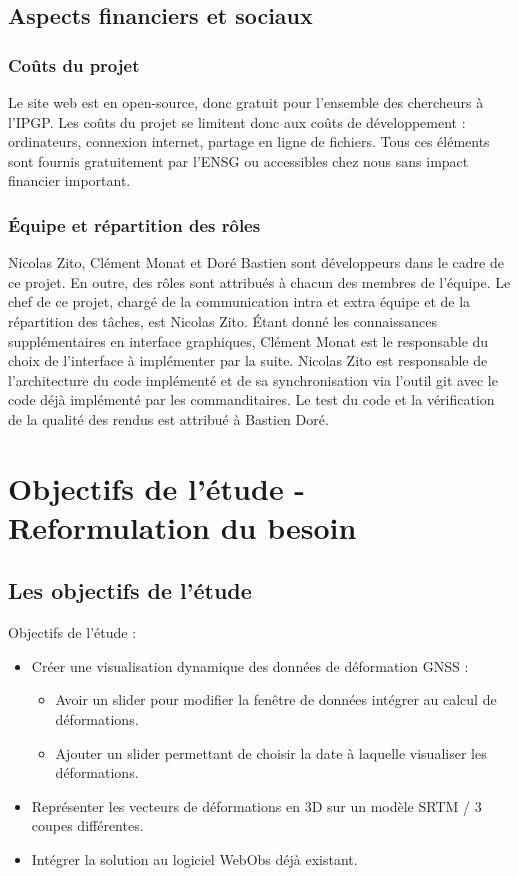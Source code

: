 \documentclass[11pt]{article}
\begin{document}
\subsection{Aspects financiers et sociaux}
\subsubsection{Coûts du projet}
    Le site web est en open-source, donc gratuit pour l'ensemble des chercheurs à l'IPGP. Les coûts du projet se limitent donc aux coûts de développement : ordinateurs, connexion internet, partage en ligne de fichiers. Tous ces éléments sont fournis gratuitement par l'ENSG ou accessibles chez nous sans impact financier important.
    
\subsubsection{Équipe et répartition des rôles}
    Nicolas Zito, Clément Monat et  Doré Bastien sont développeurs dans le cadre de ce projet.
    En outre, des rôles sont attribués à chacun des membres de l'équipe. Le chef de ce projet, chargé de la communication intra et extra équipe et de la répartition des tâches, est Nicolas Zito. Étant donné les connaissances supplémentaires en interface graphiques, Clément Monat est le responsable du choix de l'interface à implémenter par la suite. Nicolas Zito est responsable de l'architecture du code implémenté et de sa synchronisation via l'outil git avec le code déjà implémenté par les commanditaires. Le test du code et la vérification de la qualité des rendus est attribué à Bastien Doré.



\section{Objectifs de l'étude - Reformulation du besoin}
\subsection{Les objectifs de l'étude}
Objectifs de l'étude :
\vspace{0,1cm}
\begin{itemize}
\vspace{0,1cm}
    \item Créer une visualisation dynamique des données de déformation GNSS :
    \begin{itemize} 
        \item[\textbullet] Avoir un slider pour modifier la fenêtre de données intégrer au calcul de déformations.
        \item[\textbullet] Ajouter un slider permettant de choisir la date à laquelle visualiser les déformations.
    \end{itemize}
    \item Représenter les vecteurs de déformations en 3D sur un modèle SRTM / 3 coupes différentes.
    \item Intégrer la solution au logiciel WebObs déjà existant.
\end{itemize}
\end{document}
